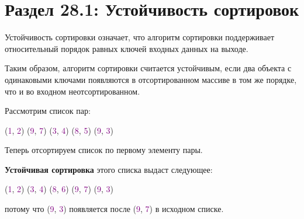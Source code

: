 \section*{Раздел 28.1: Устойчивость сортировок}

Устойчивость сортировки означает, что алгоритм сортировки поддерживает относительный порядок равных ключей входных данных на выходе.

\vspace{\baselineskip}

Таким образом, алгоритм сортировки считается устойчивым, если два объекта с одинаковыми ключами появляются в отсортированном массиве в том же порядке, что и во входном неотсортированном.

\vspace{\baselineskip}

Рассмотрим список пар:

\vspace{\baselineskip}

\begin{tcolorbox} 
(\textcolor{Purple}{1}, \textcolor{Purple}{2}) (\textcolor{Purple}{9}, \textcolor{Purple}{7}) (\textcolor{Purple}{3}, \textcolor{Purple}{4}) (\textcolor{Purple}{8}, \textcolor{Purple}{5}) (\textcolor{Purple}{9}, \textcolor{Purple}{3})
\end{tcolorbox}

\vspace{\baselineskip}

Теперь отсортируем список по первому элементу пары.

\vspace{\baselineskip}

\textbf{Устойчивая сортировка} этого списка выдаст следующее:

\vspace{\baselineskip}

\begin{tcolorbox} 
(\textcolor{Purple}{1}, \textcolor{Purple}{2}) (\textcolor{Purple}{3}, \textcolor{Purple}{4}) (\textcolor{Purple}{8}, \textcolor{Purple}{6}) (\textcolor{Purple}{9}, \textcolor{Purple}{7}) (\textcolor{Purple}{9}, \textcolor{Purple}{3})
\end{tcolorbox}

\vspace{\baselineskip}

потому что (\textcolor{Purple}{9}, \textcolor{Purple}{3}) появляется после (\textcolor{Purple}{9}, \textcolor{Purple}{7}) в исходном списке.


